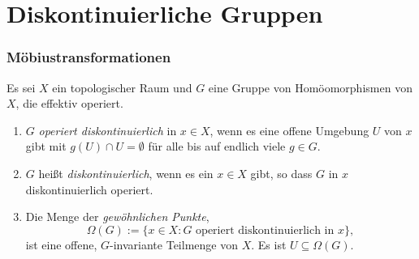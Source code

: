 \documentclass[a4paper, 12pt, twoside]{article}
\begin{document}
\cleardoublepage
\part{Diskontinuierliche Gruppen}


\section{Möbiustransformationen}\label{sec_moebius}

\DB Es sei $X$ ein topologischer Raum und $G$ eine Gruppe von
Homöomorphismen von $X$, die effektiv operiert.
\begin{enumerate}
\item $G$ \emph{operiert diskontinuierlich}
in $x\in X$, wenn es
eine offene Umgebung $U$ von $x$ gibt mit $g(U)\cap U=\emptyset$
für alle bis auf endlich viele $g\in G$.
\item $G$ heißt \emph{diskontinuierlich},
wenn es ein $x\in X$ gibt, so dass $G$ in $x$ diskontinuierlich
operiert.
\item Die Menge der \emph{gewöhnlichen Punkte},
\[
\Omega(G) := \{x\in X : G \text{ operiert diskontinuierlich in } x \},
\]
ist eine offene, $G$-invariante Teilmenge von $X$.
Es ist $U\subseteq \Omega(G)$.
\end{enumerate}
\end{document}
